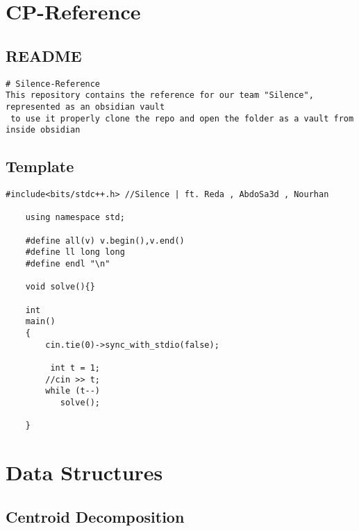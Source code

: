 \section{CP-Reference}

\subsection{README}

\begin{lstlisting}[style=cpp]
# Silence-Reference
This repository contains the reference for our team "Silence", represented as an obsidian vault
 to use it properly clone the repo and open the folder as a vault from inside obsidian
\end{lstlisting}

\subsection{Template}

\begin{lstlisting}[style=cpp]
	#include<bits/stdc++.h> //Silence | ft. Reda , AbdoSa3d , Nourhan  
	  
	using namespace std;
	
	#define all(v) v.begin(),v.end()  
	#define ll long long  
	#define endl "\n"  
	  
	void solve(){}  
	  
	int  
	main()  
	{    
		cin.tie(0)->sync_with_stdio(false);
		
		 int t = 1;  
	    //cin >> t;  
	    while (t--)  
	       solve();  
	  
	}
\end{lstlisting}

\section{Data Structures}

\subsection{Centroid Decomposition}


